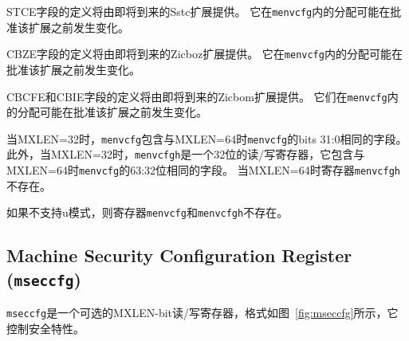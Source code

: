 {\iffalse
The definition of the STCE field will be furnished by the
forthcoming Sstc extension.
Its allocation within {\tt menvcfg} may change prior to the ratification
of that extension.

The definition of the CBZE field will be furnished by the
forthcoming Zicboz extension.
Its allocation within {\tt menvcfg} may change prior to the ratification
of that extension.
\fi
STCE字段的定义将由即将到来的Sstc扩展提供。
它在{\tt menvcfg}内的分配可能在批准该扩展之前发生变化。

CBZE字段的定义将由即将到来的Zicboz扩展提供。
它在{\tt menvcfg}内的分配可能在批准该扩展之前发生变化。

\iffalse
The definitions of the CBCFE and CBIE fields will be furnished by the
forthcoming Zicbom extension.
Their allocations within {\tt menvcfg} may change prior to the ratification
of that extension.

When MXLEN=32, {\tt menvcfg} contains the same fields as bits 31:0
of {\tt menvcfg} when MXLEN=64.
Additionally, when MXLEN=32, {\tt menvcfgh} is a 32-bit read/write register that
contains the same fields as bits 63:32 of {\tt menvcfg} when
MXLEN=64.
Register {\tt menvcfgh} does not exist when MXLEN=64.

If U-mode is not supported, then registers {\tt menvcfg} and {\tt menvcfgh} do
not exist.
\fi
CBCFE和CBIE字段的定义将由即将到来的Zicbom扩展提供。
它们在{\tt menvcfg}内的分配可能在批准该扩展之前发生变化。

当MXLEN=32时，{\tt menvcfg}包含与MXLEN=64时{\tt menvcfg}的bits 31:0相同的字段。
此外，当MXLEN=32时，{\tt menvcfgh}是一个32位的读/写寄存器，它包含与MXLEN=64时{\tt menvcfg}的63:32位相同的字段。
当MXLEN=64时寄存器{\tt menvcfgh}不存在。

如果不支持u模式，则寄存器{\tt menvcfg}和{\tt menvcfgh}不存在。

\subsection{Machine Security Configuration Register ({\tt mseccfg})}
\label{sec:mseccfg}

\iffalse
{\tt mseccfg} is an optional MXLEN-bit read/write register, formatted as shown
in Figure~\ref{fig:mseccfg}, that controls security features.

When MXLEN=32 only, {\tt mseccfgh} is a 32-bit read/write register that
contains the same fields as {\tt mseccfg} bits 63:32 when MXLEN=64.
\fi
{\tt mseccfg}是一个可选的MXLEN-bit读/写寄存器，格式如图~\ref{fig:mseccfg}所示，它控制安全特性。

}
